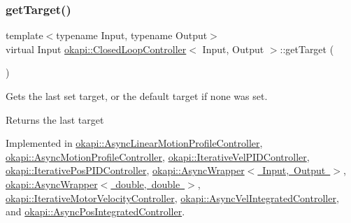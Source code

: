 \mbox{\label{classokapi_1_1ClosedLoopController_a22012bedbfaff6e5a3a508f274ec2497}} 
\subsubsection{\texorpdfstring{getTarget()}{getTarget()}}
{\footnotesize\ttfamily template$<$typename Input, typename Output$>$ \\
virtual Input \mbox{\hyperlink{classokapi_1_1ClosedLoopController}{okapi\+::\+Closed\+Loop\+Controller}}$<$ Input, Output $>$\+::get\+Target (\begin{DoxyParamCaption}{ }\end{DoxyParamCaption})\hspace{0.3cm}{\ttfamily [pure virtual]}}

Gets the last set target, or the default target if none was set.

\begin{DoxyReturn}{Returns}
the last target 
\end{DoxyReturn}


Implemented in \mbox{\hyperlink{classokapi_1_1AsyncLinearMotionProfileController_afc9a1b30a5fd499c38455e8b05982be9}{okapi\+::\+Async\+Linear\+Motion\+Profile\+Controller}}, \mbox{\hyperlink{classokapi_1_1AsyncMotionProfileController_a9f9e44e987481619cbec37d5e35c71e8}{okapi\+::\+Async\+Motion\+Profile\+Controller}}, \mbox{\hyperlink{classokapi_1_1IterativeVelPIDController_a5f2bbad6e916345f8a3abf762609321c}{okapi\+::\+Iterative\+Vel\+P\+I\+D\+Controller}}, \mbox{\hyperlink{classokapi_1_1IterativePosPIDController_a1c4c3a54b616e4250e65a88b0cb12276}{okapi\+::\+Iterative\+Pos\+P\+I\+D\+Controller}}, \mbox{\hyperlink{classokapi_1_1AsyncWrapper_a2471c7b5f388d441db77fa9199db7b83}{okapi\+::\+Async\+Wrapper$<$ Input, Output $>$}}, \mbox{\hyperlink{classokapi_1_1AsyncWrapper_a2471c7b5f388d441db77fa9199db7b83}{okapi\+::\+Async\+Wrapper$<$ double, double $>$}}, \mbox{\hyperlink{classokapi_1_1IterativeMotorVelocityController_a3e54865f6b424954f3846cd1361077c5}{okapi\+::\+Iterative\+Motor\+Velocity\+Controller}}, \mbox{\hyperlink{classokapi_1_1AsyncVelIntegratedController_a030ca47508587f799dfdd7d97ed86d7d}{okapi\+::\+Async\+Vel\+Integrated\+Controller}}, and \mbox{\hyperlink{classokapi_1_1AsyncPosIntegratedController_a8d09fefb4a02fcb9d0352b4aa68821e3}{okapi\+::\+Async\+Pos\+Integrated\+Controller}}.

